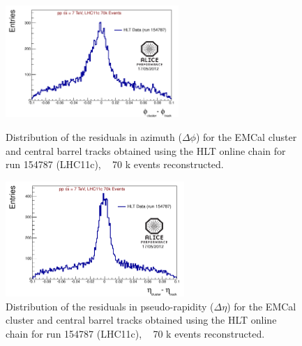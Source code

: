 \begin{figure}[hb]
\begin{minipage}{16pc}
\includegraphics[width=15.5pc]{figures/Fig4dPhi_performance.pdf}
\caption{\label{f7} 
Distribution of the residuals in azimuth ($\Delta\phi$) for the EMCal cluster and central barrel tracks
obtained using the HLT online chain for run 154787 (LHC11c), ~ 70 k events reconstructed. 
}
\end{minipage}\hspace{2pc}
\begin{minipage}{16pc}
\includegraphics[width=16pc]{figures/Fig5dEta_performance.pdf}
\caption{\label{f8} 
Distribution of the residuals in pseudo-rapidity ($\Delta\eta$) for the EMCal cluster and central barrel tracks
obtained using the HLT online chain for run 154787 (LHC11c), ~ 70 k events reconstructed.
}
\end{minipage} 
\end{figure}


